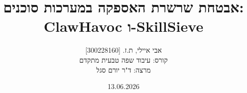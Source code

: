\title{אבטחת שרשרת האספקה במערכות סוכנים: \textenglish{ClawHavoc} ו-\textenglish{SkillSieve}}
\author{אבי איילי, ת.ז. [\textenglish{300228160}] \\ קורס: עיבוד שפה טבעית מתקדם \\ מרצה: ד"ר יורם סגל}
\date{\textenglish{13.06.2026}}
